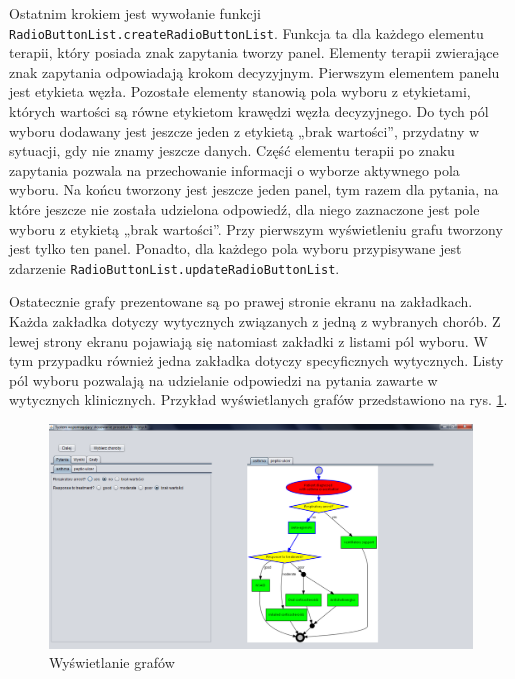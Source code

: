 Ostatnim krokiem jest wywołanie funkcji \texttt{RadioButtonList.createRadioButtonList}. 
Funkcja ta dla każdego elementu terapii, który posiada znak zapytania tworzy panel. Elementy terapii zwierające znak zapytania odpowiadają krokom decyzyjnym. Pierwszym elementem panelu jest etykieta węzła. 
Pozostałe elementy stanowią pola wyboru z etykietami, których wartości są równe etykietom krawędzi węzła decyzyjnego. 
Do tych pól wyboru dodawany jest jeszcze jeden z etykietą „brak wartości”, przydatny w sytuacji, gdy nie znamy jeszcze danych. 
Część elementu terapii po znaku zapytania pozwala na przechowanie informacji o wyborze aktywnego pola wyboru. 
Na końcu tworzony jest jeszcze jeden panel, tym razem dla pytania, na które jeszcze nie została udzielona odpowiedź, dla niego zaznaczone jest pole wyboru z etykietą „brak wartości”. Przy pierwszym wyświetleniu grafu tworzony jest tylko ten panel. Ponadto, dla każdego pola wyboru przypisywane jest zdarzenie \texttt{RadioButtonList.updateRadioButtonList}.
 
Ostatecznie grafy prezentowane są po prawej stronie ekranu na zakładkach. Każda zakładka dotyczy wytycznych związanych z jedną z wybranych chorób. Z lewej strony ekranu pojawiają się natomiast zakładki z listami pól wyboru. W tym przypadku również jedna zakładka dotyczy specyficznych wytycznych. Listy pól wyboru pozwalają na udzielanie odpowiedzi na pytania zawarte w wytycznych klinicznych. 
Przykład wyświetlanych grafów przedstawiono na rys. \ref{fig:wyswietlanie_grafow}.
\begin{figure}[H]
\centering
\includegraphics[width=\textwidth]{img/wyswietlanie_grafow.png}
\caption{Wyświetlanie grafów}
\label{fig:wyswietlanie_grafow}
\end{figure}

